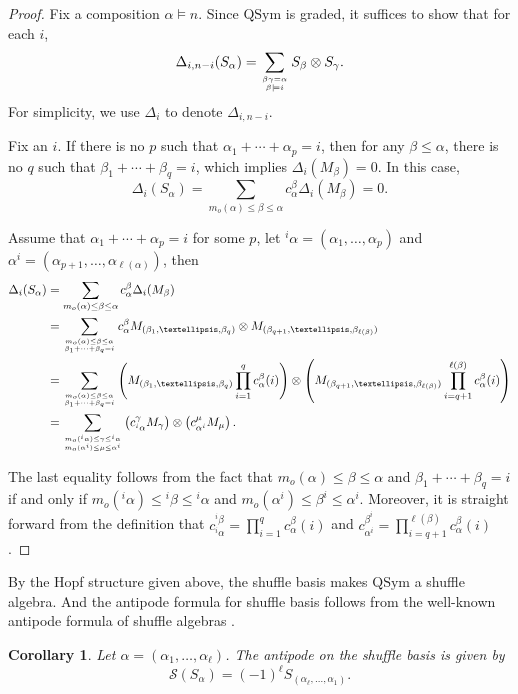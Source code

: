 \documentclass[12pt]{amsart}
\newtheorem{corollary}[theorem]{Corollary}
\numberwithin{equation}{section}
\newcommand{\QSym}{\mathrm{QSym}}
\begin{document}
\begin{proof}
	Fix a composition $\alpha\models n$. Since $\QSym$ is graded, it suffices to show that for each $i$,
	$$\Delta_{i,n-i}(S_\alpha)=\sum_{\beta\gamma=\alpha \atop \beta\models i}S_{\beta}\otimes S_{\gamma}.$$
	For simplicity, we use $\Delta_i$ to denote $\Delta_{i,n-i}$.
	
	Fix an $i$. If there is no $p$ such that $\alpha_1+\cdots+\alpha_p=i$, then for any $\beta\leq\alpha$, there is no $q$ such that $\beta_1+\cdots+\beta_q=i$, which implies $\Delta_i(M_\beta)=0$. In this case,
	$$\Delta_i(S_\alpha)=\sum_{m_o(\alpha)\leq\beta\leq\alpha}c_\alpha^\beta\Delta_i(M_\beta)=0.$$
	
	Assume that $\alpha_1+\cdots+\alpha_p=i$ for some $p$, let ${}^i\alpha=(\alpha_1,\dots,\alpha_p)$ and $\alpha^i=(\alpha_{p+1},\dots,\alpha_{\ell(\alpha)})$, then
	\begin{align*}
		\Delta_i(S_\alpha)&=\sum_{m_o(\alpha)\leq\beta\leq\alpha}c_\alpha^\beta\Delta_i(M_\beta)\\
		&=\sum_{m_o(\alpha)\leq\beta\leq\alpha \atop \beta_1+\cdots+\beta_q=i}c_\alpha^\beta M_{(\beta_1,\dots,\beta_q)}\otimes M_{(\beta_{q+1},\dots,\beta_{\ell(\beta)})}\\
		&=\sum_{m_o(\alpha)\leq\beta\leq\alpha \atop \beta_1+\cdots+\beta_q=i}\left( M_{(\beta_1,\dots,\beta_q)}\prod_{i=1}^q c_\alpha^\beta(i)\right)\otimes\left( M_{(\beta_{q+1},\dots,\beta_{\ell(\beta)})}\prod_{i=q+1}^{\ell(\beta)} c_\alpha^\beta(i)\right)\\
		&=\sum_{m_o({}^i\alpha)\leq \gamma\leq {}^i\alpha\atop m_o(\alpha^i)\leq\mu\leq\alpha^i}\left(c_{{}^i\alpha}^\gamma M_\gamma\right)\otimes \left(c_{\alpha^i}^\mu M_\mu\right).
	\end{align*}
	
	The last equality follows from the fact that $m_o(\alpha)\leq\beta\leq\alpha$ and $\beta_1+\cdots+\beta_q=i$ if and only if $m_o({}^i\alpha)\leq {}^i\beta\leq {}^i\alpha$ and $m_o(\alpha^i)\leq\beta^i\leq\alpha^i$. Moreover, it is straight forward from the definition that $c_{{}^i\alpha}^{{}^i\beta}=\prod_{i=1}^qc_\alpha^\beta(i)$ and $c_{\alpha^i}^{\beta^i}=\prod_{i=q+1}^{\ell(\beta)}c_\alpha^\beta(i)$.
\end{proof}

By the Hopf structure given above, the shuffle basis makes $\QSym$ a shuffle algebra. And the antipode formula for shuffle basis follows from the well-known antipode formula of shuffle algebras \cite{BS14}.

\begin{corollary}
	Let $\alpha=(\alpha_1,\dots,\alpha_\ell)$. The antipode on the shuffle basis is given by
	$$\mathcal{S}(S_\alpha)=(-1)^{\ell}S_{(\alpha_\ell,\dots,\alpha_1)}.$$
\end{corollary}
\end{document}
